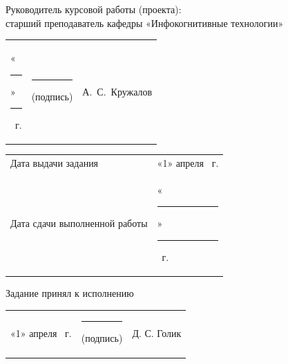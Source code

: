 \documentclass[14pt, a4paper]{extarticle}
\begin{document}

Руководитель курсовой работы (проекта): \\ старший преподаватель кафедры
«Инфокогнитивные технологии»

{
\renewcommand{\arraystretch}{2}
\noindent
\begin{tabularx}{\textwidth}{@{} P{0.45\textwidth} P{0.3\textwidth} P{0.25\textwidth} @{}}

    «\rule{0.8cm}{0.4pt}» \quad \rule{2cm}{0.4pt} ~г. &
    \centering \rule{3.5cm}{0.4pt} \par \footnotesize (подпись) &
    \hfill А.~С.~Кружалов                                         \\
\end{tabularx}

\begin{tabularx}{\textwidth}{@{} P{0.45\textwidth} P{0.55\textwidth} @{}}
    Дата выдачи задания           &
    \hfill «1» \quad апреля ~г. \\

    Дата сдачи выполненной работы &
    \hfill «\rule{0.8cm}{0.4pt}» \quad \rule{2cm}{0.4pt} ~г. \\
\end{tabularx}
}

Задание принял к исполнению

{
\renewcommand{\arraystretch}{1.5}
\begin{tabularx}{\textwidth}{@{} P{0.45\textwidth } P{0.3\textwidth} P{0.25\textwidth} @{}}

    «1» \quad апреля ~г. &
    \centering \rule{3.5cm}{0.4pt} \par \footnotesize (подпись) &
    \hfill Д. С. Голик                                         \\
\end{tabularx}
}
\end{document}
